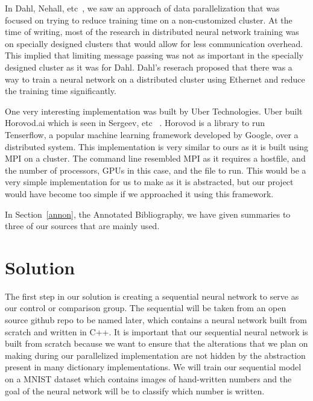 \documentclass[11pt]{article}
\begin{document}
In Dahl, Nehall, etc~\cite{dahl:NNCluster}, we saw an approach of data parallelization that was focused on trying to reduce training time on a non-customized cluster. At the time of writing, most of the research in distributed neural network training was on specially designed clusters that would allow for less communication overhead. This implied that limiting message passing was not as important in the specially designed cluster as it was for Dahl. Dahl's reserach proposed that there was a way to train a neural network on a distributed cluster using Ethernet and reduce the training time significantly. 

One very interesting implementation was built by Uber Technologies. Uber built Horovod.ai which is seen in Sergeev, etc ~\cite{Horovod:journals/corr/abs-1802-05799}. Horovod is a library to run Tenserflow, a popular machine learning framework developed by Google, over a distributed system. This implementation is very similar to ours as it is built using MPI on a cluster. The command line resembled MPI as it requires a hostfile, and the number of processors, GPUs in this case, and the file to run. This would be a very simple implementation for us to make as it is abstracted, but our project would have become too simple if we approached it using this framework.

In Section~\ref{annon}, the Annotated Bibliography, we have given summaries to three of our sources that are mainly used. 

\section {Solution}\label{soln}

The first step in our solution is creating a sequential neural network to serve as our control or comparison group. The sequential will be taken from an open source github repo to be named later, which contains a neural network built from scratch and written in C++. It is important that our sequential neural network is built from scratch because we want to ensure that the alterations that we plan on making during our parallelized implementation are not hidden by the abstraction present in many dictionary implementations. We will train our sequential model  on a MNIST dataset which contains images of hand-written numbers and the goal of the neural network will be to classify which number is written.
\end{document}
